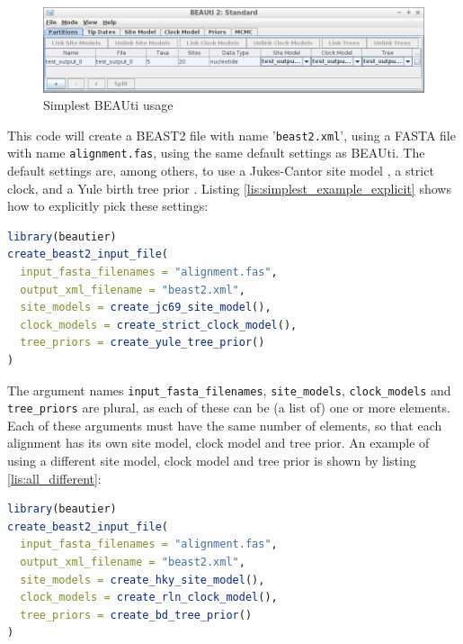 \documentclass{article}
\begin{document}
\begin{figure}
  \centering
  \includegraphics[width=\textwidth]{all_default.png}
  \caption{Simplest BEAUti usage}
  \label{fig:simplest_beauti_usage}
\end{figure}

This code will create a BEAST2 file with name '\verb;beast2.xml;',
using a FASTA file with name \verb;alignment.fas;, using the same default settings as BEAUti.
The default settings are, among others, to use a Jukes-Cantor site model \cite{cantor1969mammalian}, 
a strict clock, and a Yule birth tree prior \cite{yule}. Listing \ref{lis:simplest_example_explicit} shows how
to explicitly pick these settings:

\begin{lstlisting}[language=R, caption=Simplest example with explicit defaults, label=lst:simplest_example_explicit, floatplacement=H]
library(beautier)
create_beast2_input_file(
  input_fasta_filenames = "alignment.fas",
  output_xml_filename = "beast2.xml",
  site_models = create_jc69_site_model(),
  clock_models = create_strict_clock_model(),
  tree_priors = create_yule_tree_prior()
)
\end{lstlisting}

The argument names \verb;input_fasta_filenames;, \verb;site_models;, \verb;clock_models; and \verb;tree_priors; are plural, as each of these
can be (a list of) one or more elements. Each of these arguments must have the same number of elements, so that each alignment has its
own site model, clock model and tree prior. An example of using a different site model, clock model and tree prior is shown by listing \ref{lis:all_different}:

\begin{lstlisting}[language=R, caption=Example with different site model and clock model and tree prior, label=lst:all_different, floatplacement=H]
library(beautier)
create_beast2_input_file(
  input_fasta_filenames = "alignment.fas",
  output_xml_filename = "beast2.xml",
  site_models = create_hky_site_model(),
  clock_models = create_rln_clock_model(),
  tree_priors = create_bd_tree_prior()
)
\end{lstlisting}
\end{document}

